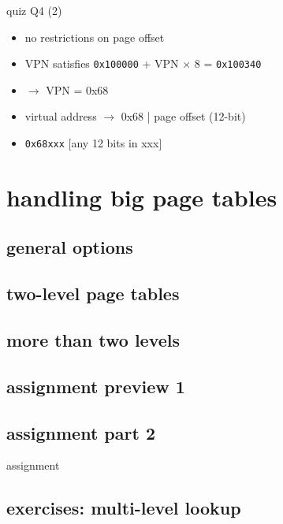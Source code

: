 \begin{frame}{quiz Q4 (2)}
    \begin{itemize}
    \item no restrictions on page offset
    \item VPN satisfies {\tt 0x100000} + VPN $\times$ 8 = \texttt{0x100340}
    \item $\rightarrow$ VPN = 0x68
    \item virtual address $\rightarrow$ 0x68 | page offset (12-bit)
    \item \texttt{0x68xxx} [any 12 bits in xxx]
    \end{itemize}
\end{frame}

\section{handling big page tables}
\subsection{general options}


\subsection{two-level page tables}




\subsection{more than two levels}


\subsection{assignment preview 1}





\subsection{assignment part 2}
\begin{frame}{assignment}
\end{frame}

\subsection{exercises: multi-level lookup}
